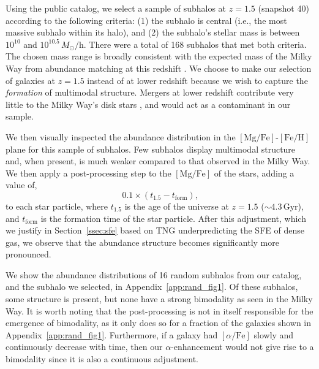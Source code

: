 \documentclass[twocolumn,linenumbers]{aastex631}
\newcommand{\Msun}{\ensuremath{M_{\odot}}}
\newcommand{\Gyr}{\ensuremath{\textrm{Gyr}}}
\newcommand{\FeH}{\ensuremath{[\textrm{Fe}/\textrm{H}]}}
\newcommand{\MgFe}{\ensuremath{[\textrm{Mg}/\textrm{Fe}]}}
\newcommand{\alphaFe}{\ensuremath{[\alpha/\textrm{Fe}]}}
\begin{document}
Using the public catalog, we select a sample of subhalos at $z=1.5$ (snapshot 40) according to the following criteria: (1) the subhalo is central (i.e., the most massive subhalo within its halo), and (2) the subhalo's stellar mass is between $10^{10}$ and $10^{10.5}\,\Msun/\textrm{h}$. There were a total of 168 subhalos that met both criteria. The chosen mass range is broadly consistent with the expected mass of the Milky Way from abundance matching at this redshift \citep{2013ApJ...771L..35V}. We choose to make our selection of galaxies at $z=1.5$ instead of at lower redshift because we wish to capture the \textit{formation} of multimodal structure. Mergers at lower redshift contribute very little to the Milky Way's disk stars \citep[e.g.,][]{2016ARA&A..54..529B}, and would act as a contaminant in our sample.

We then visually inspected the abundance distribution in the \MgFe{}-\FeH{} plane for this sample of subhalos. Few subhalos display multimodal structure and, when present, is much weaker compared to that observed in the Milky Way. We then apply a post-processing step to the \MgFe{} of the stars, adding a value of,
\begin{equation*}
  0.1\times\left(t_{1.5}-t_{\textrm{form}}\right)\textrm{,}
\end{equation*}
to each star particle, where $t_{1.5}$ is the age of the universe at $z=1.5$ ($\sim4.3\,\Gyr$), and $t_{\textrm{form}}$ is the formation time of the star particle. After this adjustment, which we justify in Section~\ref{ssec:sfe} based on TNG underpredicting the SFE of dense gas, we observe that the abundance structure becomes significantly more pronounced.

We show the abundance distributions of 16 random subhalos from our  catalog, and the subhalo we selected,  in Appendix~\ref{app:rand_fig1}. Of these subhalos, some structure is present, but none have a strong bimodality as seen in the Milky Way.  It is worth noting that the post-processing is not in itself responsible for the emergence of bimodality, as it only does so for a fraction of the galaxies shown in Appendix~\ref{app:rand_fig1}. Furthermore, if a galaxy had \alphaFe{} slowly and continuously decrease with time, then our $\alpha$-enhancement would not give rise to a bimodality since it is also a continuous adjustment. 
\end{document}
